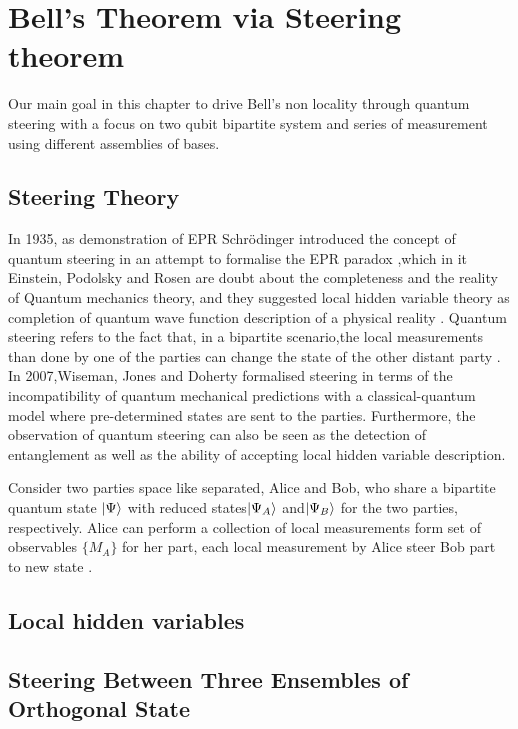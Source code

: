 \chapter{Bell's Theorem via Steering theorem}

Our  main goal in this chapter to drive Bell's non locality through quantum steering with a focus on two qubit bipartite  system and series of measurement using  different assemblies of bases.


\section{Steering Theory}

In 1935, as demonstration of EPR Schrödinger  introduced the concept of quantum steering in an attempt to formalise the EPR paradox \citep{schrodinger1935discussion},which in it Einstein, Podolsky and Rosen are doubt about the completeness and the reality of Quantum mechanics theory, and they suggested local hidden variable theory as completion of  quantum wave function description of  a physical reality \citep{EPR}. Quantum steering refers to the fact that, in a bipartite scenario,the local measurements  than done by one of the parties can change the state of the other distant party . In 2007,Wiseman, Jones and Doherty formalised steering in terms of the incompatibility of quantum mechanical predictions with a classical-quantum model where pre-determined states are sent to the parties. Furthermore, the observation of quantum steering can also be seen as the detection of entanglement as well as the ability of  accepting local hidden variable description\cite{Jevtic:2015:10.1364/JOSAB.32.000A50}.


Consider two parties space like separated, Alice and Bob, who share a bipartite quantum state $\ket{\Psi}$ with reduced states$\ket{\Psi_A}$ and$\ket{\Psi_B}$ for the two parties, respectively.  Alice can perform a collection of local measurements form set of observables $\{M_A\}$ for her part, each local measurement by Alice  steer Bob part to  new state  \cite{book:474706}.



\section{Local hidden variables}


\section{Steering Between Three Ensembles of Orthogonal State}
